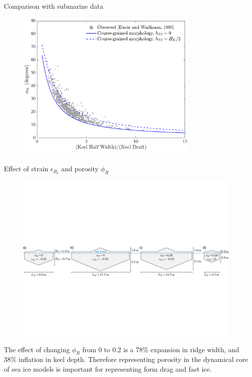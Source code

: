 \documentclass[aspectratio=169,11pt]{beamer}
\begin{document}
\begin{frame}
\frametitle{\insertsection}
\centering
Comparison with submarine data
\begin{figure}[ht]
\noindent\centerline{\includegraphics[width=0.8\textwidth,height=\textheight,keepaspectratio]{Figures/Davis_Wadhams_Comparison.eps}}
\caption{}
\end{figure}
\end{frame}

\begin{frame}
\frametitle{\insertsection}
\centering
Effect of strain $\epsilon_{R_I}$ and porosity $\phi_{R}$
\begin{figure}[ht]
\noindent\centerline{\includegraphics[width=\textwidth,height=\textheight,keepaspectratio]{Figures/Comparison_Diagram1.png}}
\label{fig:Comparison_Diagram1}
\end{figure}
The effect of changing $\phi_R$ from 0 to 0.2 is a 78\% expansion in ridge width, and 38\% inflation in keel depth. Therefore representing porosity in the dynamical core of sea ice models is important for representing form drag and fast ice.
\end{frame}
\end{document}

